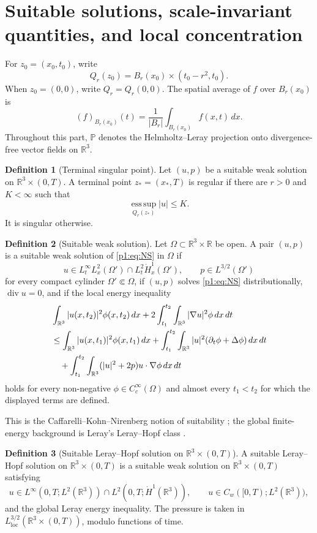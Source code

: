 \documentclass[11pt]{amsart}
\theoremstyle{plain}
\theoremstyle{definition}
\newtheorem{definition}[definition]{Definition}
\theoremstyle{remark}
\numberwithin{equation}{section}
\newcommand{\R}{\mathbb R}
\newcommand{\loc}{\mathrm{loc}}
\newcommand{\divergence}{\operatorname{div}}
\newcommand{\esssup}{\operatorname*{ess\,sup}}
\begin{document}
\section{Suitable solutions, scale-invariant quantities, and local concentration}
\label{p1:sec:prelim}

For \(z_0=(x_0,t_0)\), write
\[
   Q_r(z_0)=B_r(x_0)\times(t_0-r^2,t_0).
\]
When \(z_0=(0,0)\), write \(Q_r=Q_r(0,0)\).  The spatial average of \(f\) over
\(B_r(x_0)\) is
\[
   (f)_{B_r(x_0)}(t)=\frac1{|B_r|}\int_{B_r(x_0)}f(x,t)\,dx.
\]
Throughout this part, \(\mathbb P\) denotes the Helmholtz--Leray projection
onto divergence-free vector fields on \(\R^3\).

\begin{definition}[Terminal singular point]\label{p1:def:terminal-singular}
Let \((u,p)\) be a suitable weak solution on \(\R^3\times(0,T)\).  A terminal
point \(z_*=(x_*,T)\) is regular if there are \(r>0\) and \(K<\infty\) such
that
\[
   \esssup_{Q_r(z_*)}|u|\le K.
\]
It is singular otherwise.
\end{definition}

\begin{definition}[Suitable weak solution]\label{p1:def:suitable}
Let \(\Omega\subset\R^3\times\R\) be open.  A pair \((u,p)\) is a suitable
weak solution of \eqref{p1:eq:NS} in \(\Omega\) if
\[
   u\in L^\infty_tL^2_x(\Omega')\cap L^2_t\dot H^1_x(\Omega'),
   \qquad
   p\in L^{3/2}(\Omega')
\]
for every compact cylinder \(\Omega'\Subset\Omega\), if \((u,p)\) solves
\eqref{p1:eq:NS} distributionally, \(\divergence u=0\), and if the local energy
inequality
\begin{align}\label{p1:eq:lei}
   &\int_{\R^3}|u(x,t_2)|^2\phi(x,t_2)\,dx
   +2\int_{t_1}^{t_2}\int_{\R^3}|\nabla u|^2\phi\,dx\,dt  \notag\\
   &\le
   \int_{\R^3}|u(x,t_1)|^2\phi(x,t_1)\,dx
   +\int_{t_1}^{t_2}\int_{\R^3}|u|^2(\partial_t\phi+\Delta\phi)\,dx\,dt
   \notag\\
   &\quad
   +\int_{t_1}^{t_2}\int_{\R^3}(|u|^2+2p)u\cdot\nabla\phi\,dx\,dt
\end{align}
holds for every non-negative \(\phi\in C_c^\infty(\Omega)\) and almost every
\(t_1<t_2\) for which the displayed terms are defined.
\end{definition}

This is the Caffarelli--Kohn--Nirenberg notion of suitability
\cite{CKN1982}; the global finite-energy background is Leray's
Leray--Hopf class \cite{Leray1934}.

\begin{definition}[Suitable Leray--Hopf solution on \(\R^3\times(0,T)\)]
\label{p1:def:suitable-leray-hopf}
A suitable Leray--Hopf solution on \(\R^3\times(0,T)\) is a suitable weak
solution on \(\R^3\times(0,T)\) satisfying
\[
   u\in L^\infty(0,T;L^2(\R^3))
   \cap L^2(0,T;\dot H^1(\R^3)),
   \qquad
   u\in C_w([0,T);L^2(\R^3)),
\]
and the global Leray energy inequality.  The pressure is taken in
\(L^{3/2}_{\loc}(\R^3\times(0,T))\), modulo functions of time.
\end{definition}
\end{document}
